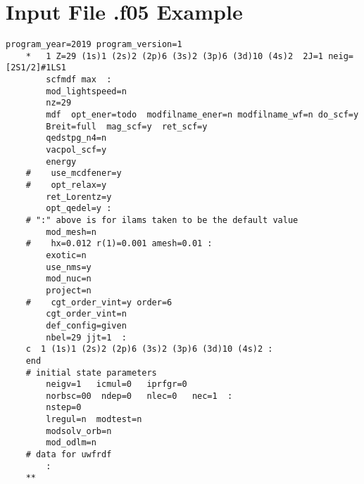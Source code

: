 
%


\chapter{Input File .f05 Example}\label{an:input}

\begin{lstlisting}[language=FORTRAN]
    program_year=2019 program_version=1
    *   1 Z=29 (1s)1 (2s)2 (2p)6 (3s)2 (3p)6 (3d)10 (4s)2  2J=1 neig=[2S1/2]#1LS1
        scfmdf max  :
        mod_lightspeed=n
        nz=29
        mdf  opt_ener=todo  modfilname_ener=n modfilname_wf=n do_scf=y     
        Breit=full  mag_scf=y  ret_scf=y
        qedstpg_n4=n
        vacpol_scf=y
        energy
    #    use_mcdfener=y
    #    opt_relax=y                                                         
        ret_Lorentz=y
        opt_qedel=y :
    # ":" above is for ilams taken to be the default value
        mod_mesh=n
    #    hx=0.012 r(1)=0.001 amesh=0.01 :
        exotic=n
        use_nms=y
        mod_nuc=n
        project=n
    #    cgt_order_vint=y order=6
        cgt_order_vint=n
        def_config=given
        nbel=29 jjt=1  :
    c  1 (1s)1 (2s)2 (2p)6 (3s)2 (3p)6 (3d)10 (4s)2 :
    end
    # initial state parameters
        neigv=1   icmul=0   iprfgr=0
        norbsc=00  ndep=0   nlec=0   nec=1  :
        nstep=0
        lregul=n  modtest=n
        modsolv_orb=n
        mod_odlm=n
    # data for uwfrdf
        :
    **
\end{lstlisting}